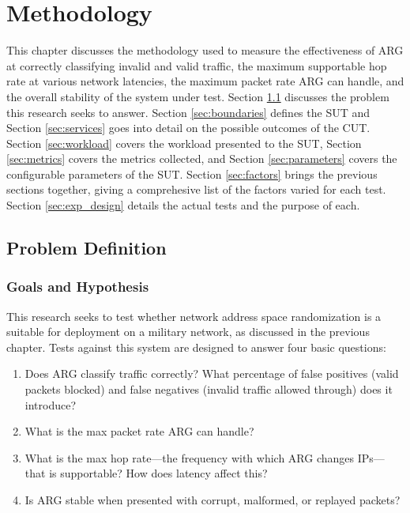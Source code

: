 \chapter{Methodology}
\label{chp:methodology}

\par This chapter discusses the methodology used to measure the effectiveness of \ac{ARG} at correctly classifying invalid and valid traffic, the maximum supportable hop rate at various network latencies, the maximum packet rate \ac{ARG} can handle, and the overall stability of the system under test. Section \ref{sec:problem_def} discusses the problem this research seeks to answer. Section \ref{sec:boundaries} defines the \ac{SUT} and Section \ref{sec:services} goes into detail on the possible outcomes of the \ac{CUT}. Section \ref{sec:workload} covers the workload presented to the \ac{SUT}, Section \ref{sec:metrics} covers the metrics collected, and Section \ref{sec:parameters} covers the configurable parameters of the \ac{SUT}. Section \ref{sec:factors} brings the previous sections together, giving a comprehesive list of the factors varied for each test. Section \ref{sec:exp_design} details the actual tests and the purpose of each.

\section{Problem Definition}
\label{sec:problem_def}
\subsection{Goals and Hypothesis}
\label{sec:goals}
\par This research seeks to test whether network address space randomization is a suitable for deployment on a military network, as discussed in the previous chapter. Tests against this system are designed to answer four basic questions:

\begin{enumerate}
\item Does \ac{ARG} classify traffic correctly? What percentage of false positives (valid packets blocked) and false negatives (invalid traffic allowed through) does it introduce?
\item What is the max packet rate \ac{ARG} can handle?
\item What is the max hop rate---the frequency with which \ac{ARG} changes \acp{IP}---that is supportable? How does latency affect this?
\item Is \ac{ARG} stable when presented with corrupt, malformed, or replayed packets?
\end{enumerate}

